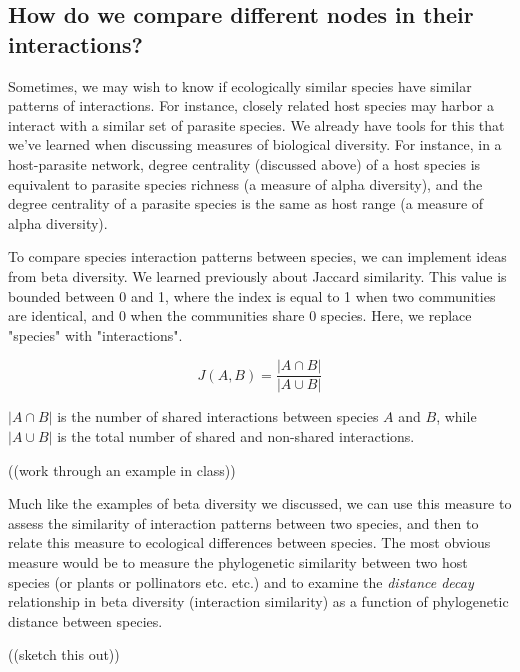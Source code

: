 \documentclass[12pt]{article}
\begin{document}
\subsection*{How do we compare different nodes in their interactions?}

Sometimes, we may wish to know if ecologically similar species have similar patterns of interactions. For instance, closely related host species may harbor a interact with a similar set of parasite species. We already have tools for this that we've learned when discussing measures of biological diversity. For instance, in a host-parasite network, degree centrality (discussed above) of a host species is equivalent to parasite species richness (a measure of alpha diversity), and the degree centrality of a parasite species is the same as host range (a measure of alpha diversity).

To compare species interaction patterns between species, we can implement ideas from beta diversity. We learned previously about Jaccard similarity. This value is bounded between 0 and 1, where the index is equal to 1 when two communities are identical, and 0 when the communities share 0 species. Here, we replace "species" with "interactions". 


\[ J(A,B) =  \frac{| A \cap	 B |}{| A \cup B|} \]

$| A \cap	 B |$ is the number of shared interactions between species $A$ and $B$, while $| A \cup B |$ is the total number of shared and non-shared interactions. \\

\bigskip

((work through an example in class)) \\

\medskip


Much like the examples of beta diversity we discussed, we can use this measure to assess the similarity of interaction patterns between two species, and then to relate this measure to ecological differences between species. The most obvious measure would be to measure the phylogenetic similarity between two host species (or plants or pollinators etc. etc.) and to examine the \textit{distance decay} relationship in beta diversity (interaction similarity) as a function of phylogenetic distance between species. \\


\bigskip

((sketch this out)) \\

\medskip
\end{document}
